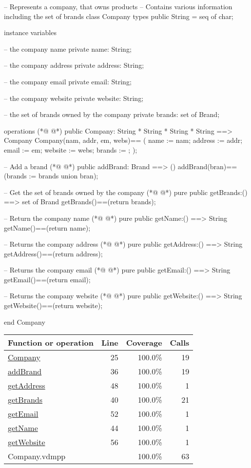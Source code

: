 \begin{vdmpp}[breaklines=true]
-- Represents a company, that owns products
-- Contains various information including the set of brands
class Company
 types
  public String = seq of char;
 
 instance variables
 
   -- the company name
  private name: String;
  
  -- the company address
  private address: String;
  
  -- the company email
  private email: String;
  
  -- the company website
  private website: String;
  
  -- the set of brands owned by the company
  private brands: set of Brand;
  
 operations
(*@
\label{Company:25}
@*)
  public Company: String * String * String * String ==> Company 
  Company(nam, addr, em, webs)==
  (
   name := nam;
   address := addr;
   email := em;
   website := webs;
   brands := {};
  );
  
  -- Add a brand
(*@
\label{addBrand:36}
@*)
  public addBrand: Brand ==> ()
  addBrand(bran)==(brands := brands union {bran});
  
  -- Get the set of brands owned by the company
(*@
\label{getBrands:40}
@*)
  pure public getBrands:() ==> set of Brand
  getBrands()==(return brands);

  -- Return the company name
(*@
\label{getName:44}
@*)
  pure public getName:() ==> String
  getName()==(return name);
  
  -- Returns the company address
(*@
\label{getAddress:48}
@*)
  pure public getAddress:() ==> String
  getAddress()==(return address);
  
  -- Returns the company email
(*@
\label{getEmail:52}
@*)
  pure public getEmail:() ==> String
  getEmail()==(return email);
  
  -- Returns the company website
(*@
\label{getWebsite:56}
@*)
  pure public getWebsite:() ==> String
  getWebsite()==(return website);
  
end Company
\end{vdmpp}
\bigskip
\begin{longtable}{|l|r|r|r|}
\hline
Function or operation & Line & Coverage & Calls \\
\hline
\hline
\hyperref[Company:25]{Company} & 25&100.0\% & 19 \\
\hline
\hyperref[addBrand:36]{addBrand} & 36&100.0\% & 19 \\
\hline
\hyperref[getAddress:48]{getAddress} & 48&100.0\% & 1 \\
\hline
\hyperref[getBrands:40]{getBrands} & 40&100.0\% & 21 \\
\hline
\hyperref[getEmail:52]{getEmail} & 52&100.0\% & 1 \\
\hline
\hyperref[getName:44]{getName} & 44&100.0\% & 1 \\
\hline
\hyperref[getWebsite:56]{getWebsite} & 56&100.0\% & 1 \\
\hline
\hline
Company.vdmpp & & 100.0\% & 63 \\
\hline
\end{longtable}

